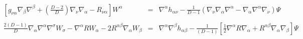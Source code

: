 \documentclass[10pt,letterpaper]{article}
\numberwithin{equation}{section}
\begin{document}
\begin{appendices}
\begin{eqnarray}
\end{eqnarray}
\begin{eqnarray}
\left[g_{\nu\alpha}\nabla_\beta\nabla^\beta + \left(\frac{D-2}{D}\right)\nabla_\nu \nabla_\alpha - R_{\nu\alpha}\right]W^\alpha &=&
\nabla^\alpha h_{\alpha\nu} - \frac{1}{D-1}\left(\nabla_\nu \nabla_\alpha\nabla^\alpha - \nabla_\alpha\nabla^\alpha \nabla_\nu\right)
\Psi
\\\nonumber \\
\frac{2(D-1)}{D}\nabla_\alpha\nabla^\alpha \nabla^\sigma W_\sigma - \nabla^\alpha R W_\alpha - 2R^{\alpha\beta} \nabla_\alpha W_{\beta} &=& 
\nabla^\alpha\nabla^\beta h_{\alpha\beta} - \frac{1}{(D-1)}\left[ \tfrac12 \nabla^\alpha R \nabla_\alpha + R^{\alpha\beta}\nabla_\alpha\nabla_\beta\right]\Psi
\end{eqnarray}

\end{appendices}
\end{document}
